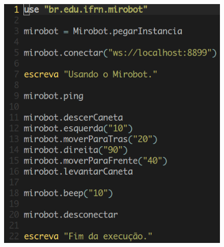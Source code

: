 \begin{figure}[H]
\centering
\includegraphics[scale=0.50]{imagens/teste_potigol.png} 
\label{fig:teste_potigol}
\end{figure}

